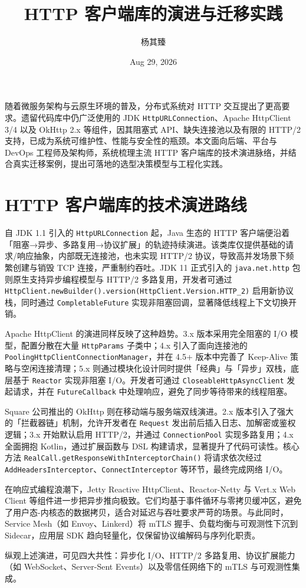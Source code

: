 \title{HTTP 客户端库的演进与迁移实践}
\author{杨其臻}
\date{Aug 29, 2026}
\maketitle
随着微服务架构与云原生环境的普及，分布式系统对 HTTP 交互提出了更高要求。遗留代码库中仍广泛使用的 JDK \texttt{HttpURLConnection}、Apache HttpClient 3/4 以及 OkHttp 2.x 等组件，因其阻塞式 API、缺失连接池以及有限的 HTTP/2 支持，已成为系统可维护性、性能与安全性的瓶颈。本文面向后端、平台与 DevOps 工程师及架构师，系统梳理主流 HTTP 客户端库的技术演进脉络，并结合真实迁移案例，提出可落地的选型决策模型与工程化实践。\par
\chapter{HTTP 客户端库的技术演进路线}
自 JDK 1.1 引入的 \texttt{HttpURLConnection} 起，Java 生态的 HTTP 客户端便沿着「阻塞→异步、多路复用→协议扩展」的轨迹持续演进。该类库仅提供基础的请求/响应抽象，内部既无连接池，也未实现 HTTP/2 协议，导致高并发场景下频繁创建与销毁 TCP 连接，严重制约吞吐。JDK 11 正式引入的 \texttt{java.net.http} 包则原生支持异步编程模型与 HTTP/2 多路复用，开发者可通过 \texttt{HttpClient.newBuilder().version(HttpClient.Version.HTTP\_{}2)} 启用新协议栈，同时通过 \texttt{CompletableFuture} 实现非阻塞回调，显著降低线程上下文切换开销。\par
Apache HttpClient 的演进同样反映了这种趋势。3.x 版本采用完全阻塞的 I/O 模型，配置分散在大量 \texttt{HttpParams} 子类中；4.x 引入了面向连接池的 \texttt{PoolingHttpClientConnectionManager}，并在 4.5+ 版本中完善了 Keep-Alive 策略与空闲连接清理；5.x 则通过模块化设计同时提供「经典」与「异步」双栈，底层基于 \texttt{Reactor} 实现非阻塞 I/O。开发者可通过 \texttt{CloseableHttpAsyncClient} 发起请求，并在 \texttt{FutureCallback} 中处理响应，避免了同步等待带来的线程阻塞。\par
Square 公司推出的 OkHttp 则在移动端与服务端双线演进。2.x 版本引入了强大的「拦截器链」机制，允许开发者在 \texttt{Request} 发出前后插入日志、加解密或鉴权逻辑；3.x 开始默认启用 HTTP/2，并通过 \texttt{ConnectionPool} 实现多路复用；4.x 全面拥抱 Kotlin，通过扩展函数与 DSL 构建请求，显著提升了代码可读性。核心方法 \texttt{RealCall.getResponseWithInterceptorChain()} 将请求依次经过 \texttt{AddHeadersInterceptor}、\texttt{ConnectInterceptor} 等环节，最终完成网络 I/O。\par
在响应式编程浪潮下，Jetty Reactive HttpClient、Reactor-Netty 与 Vert.x Web Client 等组件进一步把异步推向极致。它们均基于事件循环与零拷贝缓冲区，避免了用户态-内核态的数据拷贝，适合对延迟与吞吐要求严苛的场景。与此同时，Service Mesh（如 Envoy、Linkerd）将 mTLS 握手、负载均衡与可观测性下沉到 Sidecar，应用层 SDK 趋向轻量化，仅保留协议编解码与序列化职责。\par
纵观上述演进，可见四大共性：异步化 I/O、HTTP/2 多路复用、协议扩展能力（如 WebSocket、Server-Sent Events）以及零信任网络下的 mTLS 与可观测性集成。\par
